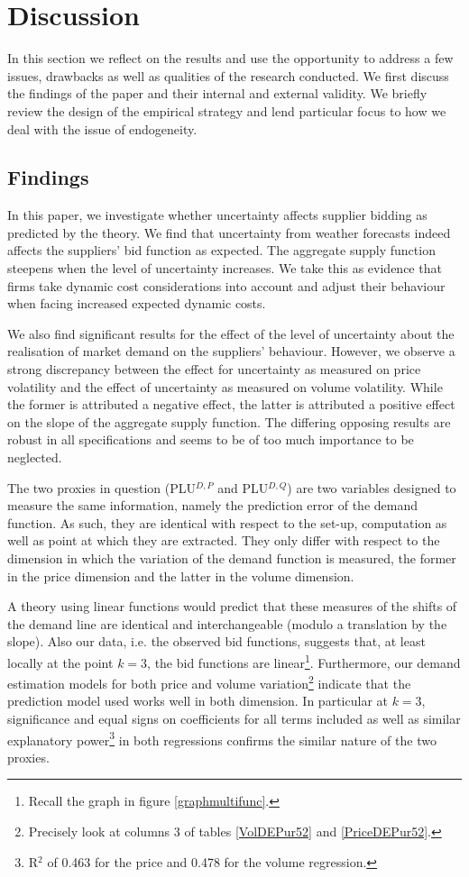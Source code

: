 \section{Discussion }
\label{discussgeneral}
\pagestyle{plain}
In this section we reflect on the results and use the opportunity to address a few issues, drawbacks as well as qualities of the research conducted. We first discuss the findings of the paper and their internal and external validity. We briefly review the design of the empirical strategy and lend particular focus to how we deal with the issue of endogeneity.

\subsection{Findings}
In this paper, we investigate whether uncertainty affects supplier bidding as predicted by the theory. 
We find that uncertainty from weather forecasts indeed affects the suppliers' bid function as expected. The aggregate supply function steepens when the level of uncertainty increases. We take this as evidence that firms take dynamic cost considerations into account and adjust their behaviour when facing increased expected dynamic costs. 

We also find significant results for the effect of the level of uncertainty about the realisation of market demand on the suppliers' behaviour. However, we observe a strong discrepancy between the effect for uncertainty as measured on price volatility and the effect of uncertainty as measured on volume volatility. While the former is attributed a negative effect, the latter is attributed a positive effect on the slope of the aggregate supply function. 
The differing opposing results are robust in all specifications and seems to be of too much importance to be neglected. 

The two proxies in question (PLU$^{D,P}$ and PLU$^{D,Q}$) are two variables designed to measure the same information, namely the prediction error of the demand function.
As such, they are identical with respect to the set-up, computation as well as point at which they are extracted. They only differ with respect to the dimension in which the variation of the demand function  is measured, the former in the price dimension and the latter in the volume dimension. 

A theory using linear functions would predict that these measures of the shifts of the demand line are identical and interchangeable (modulo a translation by the slope). Also our data, i.e. the observed bid functions,  suggests that, at least locally at the point $k=3$, the bid functions are linear\footnote{Recall the graph in figure \ref{graphmultifunc}.}. Furthermore, our demand estimation models for both price and volume variation\footnote{Precisely look at columns 3 of tables \ref{VolDEPur52} and \ref{PriceDEPur52}.} indicate that the prediction model used works well in both dimension. In particular at $k=3$, significance and equal signs on coefficients for all terms included as well as similar explanatory power\footnote{R$^2$ of 0.463 for the price  and 0.478 for the volume regression.} in both regressions confirms the similar nature of the two proxies. 

